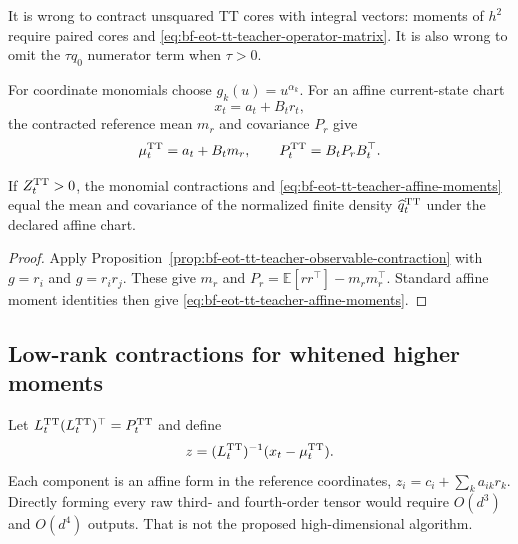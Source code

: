 It is wrong to contract unsquared TT cores with integral vectors: moments of
\(h^2\) require paired cores and
\eqref{eq:bf-eot-tt-teacher-operator-matrix}.  It is also wrong to omit the
\(\tau q_0\) numerator term when \(\tau>0\).

For coordinate monomials choose \(g_k(u)=u^{\alpha_k}\).  For an affine
current-state chart
\begin{equation}
 x_t=a_t+B_tr_t,
 \label{eq:bf-eot-tt-teacher-affine-chart}
\end{equation}
the contracted reference mean \(m_r\) and covariance \(P_r\) give
\begin{equation}
 \mu_t^{\rm TT}=a_t+B_tm_r,\qquad
 P_t^{\rm TT}=B_tP_rB_t^\top.
 \label{eq:bf-eot-tt-teacher-affine-moments}
\end{equation}

\begin{proposition}
\label{prop:bf-eot-tt-teacher-affine-moments}
If \(Z_t^{\rm TT}>0\), the monomial contractions and
\eqref{eq:bf-eot-tt-teacher-affine-moments} equal the mean and covariance of
the normalized finite density \(\widehat q_t^{\rm TT}\) under the declared
affine chart.
\end{proposition}

\begin{proof}
Apply Proposition~\ref{prop:bf-eot-tt-teacher-observable-contraction} with
\(g=r_i\) and \(g=r_ir_j\).  These give \(m_r\) and
\(P_r=\mathbb E[rr^\top]-m_rm_r^\top\).  Standard affine moment identities
then give \eqref{eq:bf-eot-tt-teacher-affine-moments}.
\end{proof}
\subsection{Low-rank contractions for whitened higher moments}

Let \(L_t^{\rm TT}(L_t^{\rm TT})^\top=P_t^{\rm TT}\) and define
\begin{equation}
 z=(L_t^{\rm TT})^{-1}(x_t-\mu_t^{\rm TT}).
 \label{eq:bf-eot-tt-teacher-whitening}
\end{equation}
Each component is an affine form in the reference coordinates,
\(z_i=c_i+\sum_ka_{ik}r_k\).  Directly forming every raw third- and
fourth-order tensor would require \(O(d^3)\) and \(O(d^4)\) outputs.  That is
not the proposed high-dimensional algorithm.


